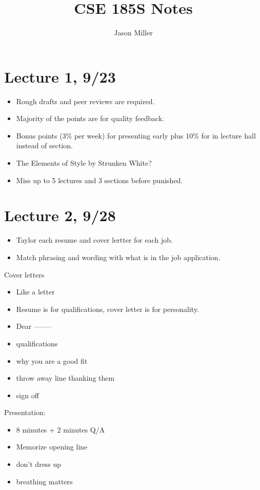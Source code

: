 \documentclass[12pt]{article}
\begin{document}
\title{CSE 185S Notes}
\author{Jason Miller}
\maketitle 

\tableofcontents

\newpage 
\section{Lecture 1, 9/23}
\begin{itemize}
\item Rough drafts and peer reviews are required. 
\item Majority of the points are for quality feedback. 
\item Bonus points (3\% per week) for presenting early plus 10\% for in lecture hall instead of section.
\item The Elements of Style by Strunken White?
\item Miss up to 5 lectures and 3 sections before punished. 
\end{itemize}

\newpage
\section{Lecture 2, 9/28}
\begin{itemize}
\item Taylor each resume and cover lertter for each job. 
\item Match phrasing and wording with what is in the job application. 
 
\end{itemize}
Cover letters
\begin{itemize}
\item Like a letter
\item Resume is for qualifications, cover letter is for personality. 
\item Dear --------
\item qualifications 
\item why you are a good fit 
\item throw away line thanking them 
\item sign off 
\end{itemize}

Presentation: 

\begin{itemize}
\item 8 minutes +  2 minutes Q/A 
\item Memorize opening line 
\item don't dress up
\item breathing matters
\end{itemize}
\end{document}
